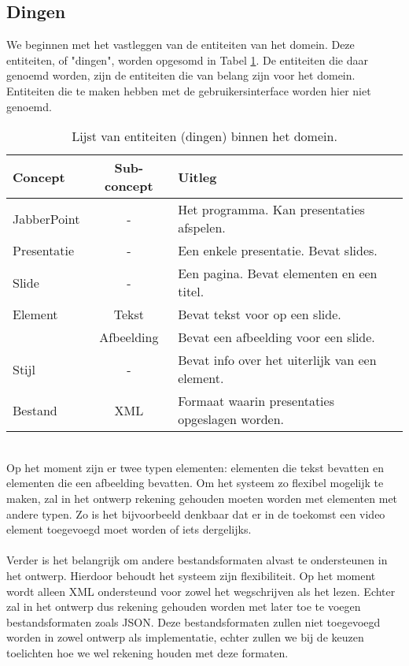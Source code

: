 \documentclass[a4paper]{article}
\begin{document}
\subsection{Dingen}
We beginnen met het vastleggen van de entiteiten van het domein. Deze entiteiten, of "dingen", worden opgesomd in Tabel \ref{table:dingen}. De entiteiten die daar genoemd worden, zijn de entiteiten die van belang zijn voor het domein. Entiteiten die te maken hebben met de gebruikersinterface worden hier niet genoemd.
\begin{table}[!h]
\centering
	\begin{tabular}{lcl}
	\toprule
 	Concept & Sub-concept & Uitleg \\ \midrule
 	JabberPoint & - & Het programma. Kan presentaties afspelen. \\
 	Presentatie & - & Een enkele presentatie. Bevat slides. \\
 	Slide & - & Een pagina. Bevat elementen en een titel.\\
 	Element & Tekst & Bevat tekst voor op een slide.\\
 	 & Afbeelding & Bevat een afbeelding voor een slide.\\
 	Stijl & - & Bevat info over het uiterlijk van een element.\\
 	Bestand & XML & Formaat waarin presentaties opgeslagen worden.\\
 	\bottomrule
	\end{tabular}
\caption{Lijst van entiteiten (dingen) binnen het domein.}
\label{table:dingen}
\end{table}
\\
Op het moment zijn er twee typen elementen: elementen die tekst bevatten en elementen die een afbeelding bevatten. Om het systeem zo flexibel mogelijk te maken, zal in het ontwerp rekening gehouden moeten worden met elementen met andere typen. Zo is het bijvoorbeeld denkbaar dat er in de toekomst een video element toegevoegd moet worden of iets dergelijks.
\\\\
Verder is het belangrijk om andere bestandsformaten alvast te ondersteunen in het ontwerp. Hierdoor behoudt het systeem zijn flexibiliteit. Op het moment wordt alleen XML ondersteund voor zowel het wegschrijven als het lezen. Echter zal in het ontwerp dus rekening gehouden worden met later toe te voegen bestandsformaten zoals JSON. Deze bestandsformaten zullen niet toegevoegd worden in zowel ontwerp als implementatie, echter zullen we bij de keuzen toelichten hoe we wel rekening houden met deze formaten.
\end{document}
